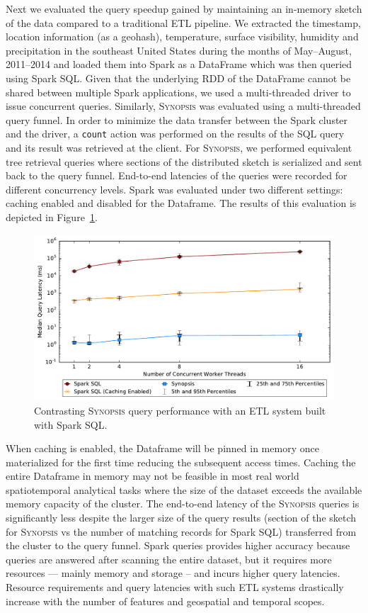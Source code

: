 Next we evaluated the query speedup gained by maintaining an in-memory sketch of the data compared to a traditional ETL pipeline.
We extracted the timestamp, location information (as a geohash), temperature, surface visibility, humidity and precipitation in the southeast United States during the months of May--August, 2011--2014 and loaded them into Spark as a DataFrame which was then queried using Spark SQL.
Given that the underlying RDD of the DataFrame cannot be shared between multiple Spark applications, we used a multi-threaded driver to issue concurrent queries.
Similarly, \textsc{Synopsis} was evaluated using a multi-threaded query funnel.
In order to minimize the data transfer between the Spark cluster and the driver, a \texttt{count} action was performed on the results of the SQL query and its result was retrieved at the client.
For \textsc{Synopsis}, we performed equivalent tree retrieval queries where sections of the distributed sketch is serialized and sent back to the query funnel.
End-to-end latencies of the queries were recorded for different concurrency levels.
Spark was evaluated under two different settings: caching enabled and disabled for the Dataframe.
The results of this evaluation is depicted in Figure~\ref{fig:spark-sql-query}.
%
\begin{figure}[b!]
    \centerline{\includegraphics[width=\linewidth]{figures/spark-sql-query-complete.pdf}}
    \caption{Contrasting \textsc{Synopsis} query performance with an ETL system built with Spark SQL.}
    \label{fig:spark-sql-query}
\end{figure}
%
When caching is enabled, the Dataframe will be pinned in memory once materialized for the first time reducing the subsequent access times. Caching the entire Dataframe in memory may not be feasible in most real world spatiotemporal analytical tasks where the size of the dataset exceeds the available memory capacity of the cluster.
The end-to-end latency of the \textsc{Synopsis} queries is significantly less despite the larger size of the query results (section of the sketch for \textsc{Synopsis} vs the number of matching records for Spark SQL) transferred from the cluster to the query funnel.
Spark queries provides higher accuracy because queries are answered after scanning the entire dataset, but it requires more resources --- mainly memory and storage -- and incurs higher query latencies.
Resource requirements and query latencies with such ETL systems drastically increase with the number of features and geospatial and temporal scopes.
